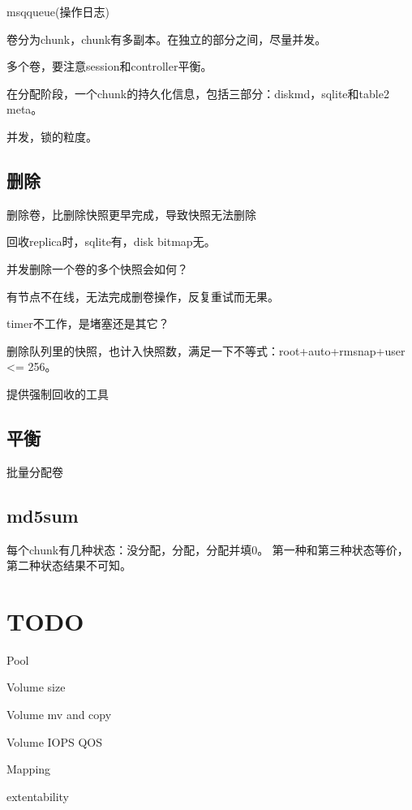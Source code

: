msqqueue(操作日志)

卷分为chunk，chunk有多副本。在独立的部分之间，尽量并发。

多个卷，要注意session和controller平衡。

在分配阶段，一个chunk的持久化信息，包括三部分：diskmd，sqlite和table2 meta。

并发，锁的粒度。

\subsection{删除}

删除卷，比删除快照更早完成，导致快照无法删除

回收replica时，sqlite有，disk bitmap无。

并发删除一个卷的多个快照会如何？

有节点不在线，无法完成删卷操作，反复重试而无果。

timer不工作，是堵塞还是其它？

删除队列里的快照，也计入快照数，满足一下不等式：root+auto+rmsnap+user <= 256。

提供强制回收的工具

\subsection{平衡}

批量分配卷

\subsection{md5sum}

每个chunk有几种状态：没分配，分配，分配并填0。
第一种和第三种状态等价，第二种状态结果不可知。

\section{TODO}

\begin{enumbox}
\item Pool
\item Volume size
\item Volume mv and copy
\item Volume IOPS QOS
\item Mapping
\item extentability
\end{enumbox}

